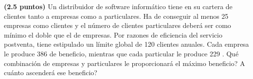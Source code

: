 
\textbf{(2.5 puntos)} Un distribuidor de software informático tiene en su cartera de clientes tanto a empresas como a particulares. Ha de conseguir al menos 25 empresas como clientes y el número de clientes particulares deberá ser como mínimo el doble que el de empresas. Por razones de eficiencia del servicio postventa, tiene estipulado un límite global de 120 clientes anuales. Cada empresa le produce 386 \texteuro{} de beneficio, mientras que cada particular le produce 229 \texteuro{}. \textquestiondown{}Qué combinación de empresas y particulares le proporcionará el máximo beneficio? \textquestiondown{}A cuánto ascenderá ese beneficio?
